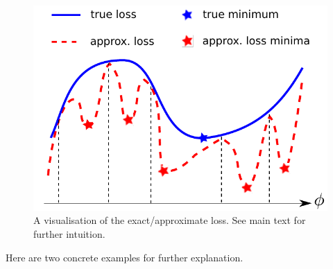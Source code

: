 \begin{figure}
\centering
\includegraphics[width=0.5\linewidth]{Chapter5/approx_loss.pdf}
\caption{A visualisation of the exact/approximate loss. See main text for further intuition.}
\label{fig:chap_wild_loss_pathology}
\end{figure}

Here are two concrete examples for further explanation.

